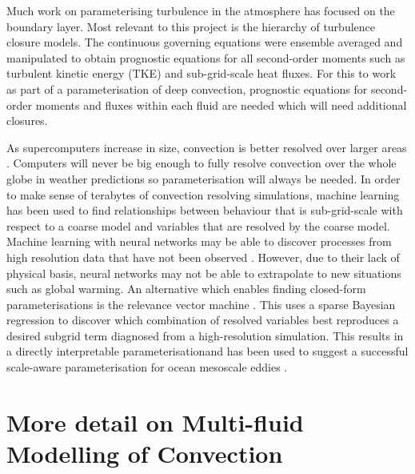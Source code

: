 \documentclass[11pt,a4paper]{article}
\begin{document}
Much work on parameterising turbulence in the atmosphere has focused on the boundary layer. Most relevant to this project is the \citet{mellor1973,mellor1974,mellor1982} hierarchy of turbulence closure models. The continuous governing equations were ensemble averaged and manipulated to obtain prognostic equations for all second-order moments such as turbulent kinetic energy (TKE) and sub-grid-scale heat fluxes. For this to work as part of a parameterisation of deep convection, prognostic equations for second-order moments and fluxes within each fluid are needed which will need additional closures.

As supercomputers increase in size, convection is better resolved over larger areas \cite[eg.][]{GC17}. Computers will never be big enough to fully resolve convection over the whole globe in weather predictions \cite[eg.][]{SSJ+19} so parameterisation will always be needed. In order to make sense of terabytes of convection resolving simulations, machine learning has been used to find relationships between behaviour that is sub-grid-scale with respect to a coarse model and variables that are resolved by the coarse model. Machine learning with neural networks may be able to discover processes from high resolution data that have not been observed \cite[eg.][]{ogorman2018}. However, due to their lack of physical basis, neural networks may not be able to extrapolate to new situations such as global warming. An alternative which enables finding closed-form parameterisations is the relevance vector machine \cite[eg][]{tipping2001}. This uses a sparse Bayesian regression to discover which combination of resolved variables best reproduces a desired subgrid term diagnosed from a high-resolution simulation. This results in a directly interpretable parameterisationand has been used to suggest a successful scale-aware parameterisation for ocean mesoscale eddies \cite[]{zanna2020}.

\section{More detail on Multi-fluid Modelling of Convection}
\label{sec:mf}
\end{document}
